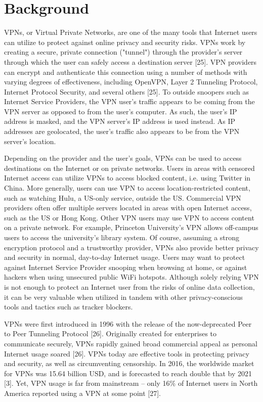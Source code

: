 \section{Background}\label{sec:background}
VPNs, or Virtual Private Networks, are one of the many tools that Internet
users can utilize to protect against online privacy and security risks. VPNs
work by creating a secure, private connection ("tunnel") through the
provider's server through which the user can safely access a destination
server [25]. VPN providers can encrypt and authenticate this connection using
a number of methods with varying degrees of effectiveness, including OpenVPN,
Layer 2 Tunneling Protocol, Internet Protocol Security, and several others
[25]. To outside snoopers such as Internet Service Providers, the VPN user's
traffic appears to be coming from the VPN server as opposed to from the user's
computer. As such, the user's IP address is masked, and the VPN server's IP
address is used instead. As IP addresses are geolocated, the user's traffic
also appears to be from the VPN server's location.

Depending on the provider and the user's goals, VPNs can be used to access
destinations on the Internet or on private networks. Users in areas with
censored Internet access can utilize VPNs to access blocked content, i.e.
using Twitter in China. More generally, users can use VPN to access
location-restricted content, such as watching Hulu, a US-only service, outside
the US. Commercial VPN providers often offer multiple servers located in areas
with open Internet access, such as the US or Hong Kong. Other VPN users may
use VPN to access content on a private network. For example, Princeton
University's VPN allows off-campus users to access the university's library
system. Of course, assuming a strong encryption protocol and a trustworthy
provider, VPNs also provide better privacy and security in normal, day-to-day
Internet usage. Users may want to protect against Internet Service Provider
snooping when browsing at home, or against hackers when using unsecured public
WiFi hotspots. Although solely relying VPN is not enough to protect an
Internet user from the risks of online data collection, it can be very
valuable when utilized in tandem with other privacy-conscious tools and
tactics such as tracker blockers.

VPNs were first introduced in 1996 with the release of the now-deprecated Peer
to Peer Tunneling Protocol [26]. Originally created for enterprises to
communicate securely, VPNs rapidly gained broad commercial appeal as personal
Internet usage soared [26]. VPNs today are effective tools in protecting
privacy and security, as well as circumventing censorship. In 2016, the
worldwide market for VPNs was 15.64 billion USD, and is forecasted to reach
double that by 2021 [3]. Yet, VPN usage is far from mainstream -- only 16\% of
Internet users in North America reported using a VPN at some point [27].
